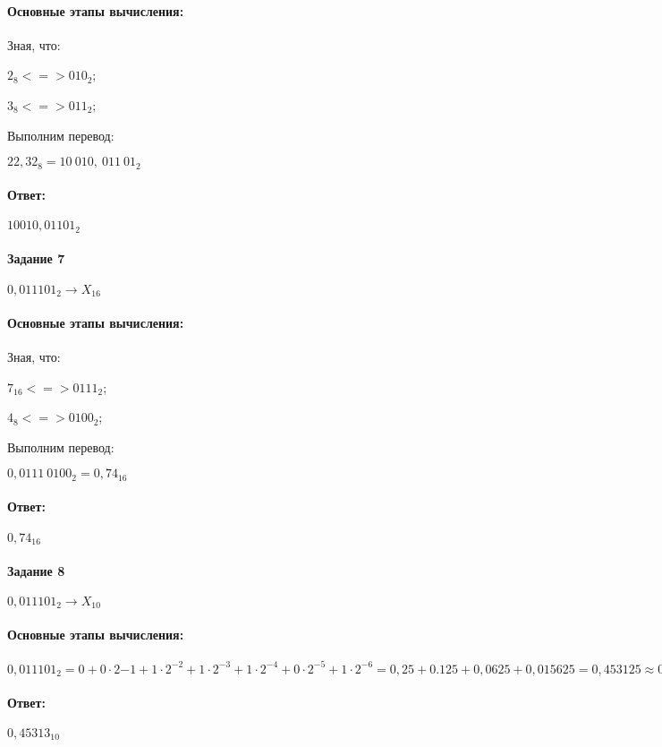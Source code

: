 \paragraph{Основные этапы вычисления:}
\hfill \break


Зная, что:

$2_{8} <=> 010_{2}$;

$3_{8} <=> 011_{2}$;

Выполним перевод:

$22,32_{8} = 10~010,~011~01_{2}$

\paragraph{Ответ:}
$10010,01101_{2}$

\paragraph{Задание 7}
$0,011101_{2} \rightarrow X_{16}$
\paragraph{Основные этапы вычисления:}
\hfill \break


Зная, что:

$7_{16} <=> 0111_{2}$;

$4_{8} <=> 0100_{2}$;

Выполним перевод:

$0,0111~0100_{2} = 0,74_{16}$

\paragraph{Ответ:}
$0,74_{16}$

\paragraph{Задание 8}
$0,011101_{2} \rightarrow X_{10}$

\paragraph{Основные этапы вычисления:}
\hfill \break
$0,011101_{2} = 0 + 0\cdot2{-1} + 1\cdot2^{-2} + 1\cdot2^{-3} + 1\cdot2^{-4} + 0\cdot2^{-5}+1\cdot2^{-6} = 0,25+0.125+0,0625+0,015625 = 0,453125 \approx 0,45313_{10}$

\paragraph{Ответ:}
$0,45313_{10}$

